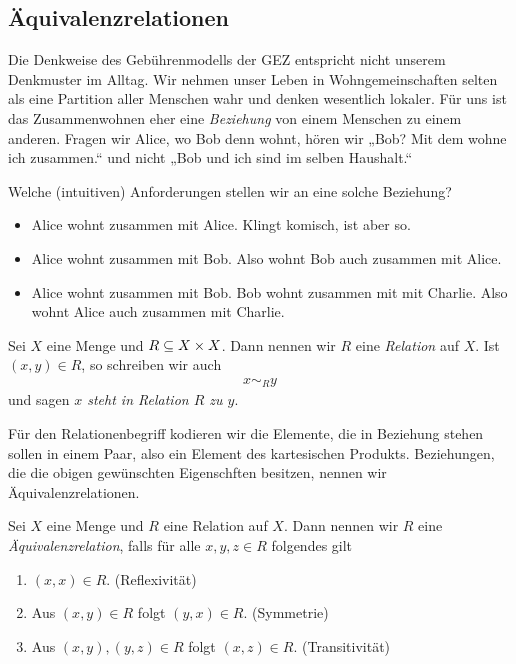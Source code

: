 \subsection{Äquivalenzrelationen}

Die Denkweise des Gebührenmodells der GEZ entspricht nicht unserem
Denkmuster im Alltag. Wir nehmen unser Leben in Wohngemeinschaften selten
als eine Partition aller Menschen wahr und denken wesentlich lokaler. Für
uns ist das Zusammenwohnen eher eine \emph{Beziehung} von einem Menschen zu
einem anderen. Fragen wir Alice, wo Bob denn wohnt, hören wir „Bob? Mit dem
wohne ich zusammen.“ und nicht „Bob und ich sind im selben Haushalt.“

Welche (intuitiven) Anforderungen stellen wir an eine solche Beziehung?

\begin{itemize}
  \item Alice wohnt zusammen mit Alice. Klingt komisch, ist aber so.
  \item Alice wohnt zusammen mit Bob. Also wohnt Bob auch zusammen mit
    Alice.
  \item Alice wohnt zusammen mit Bob. Bob wohnt zusammen mit mit
    Charlie. Also wohnt Alice auch zusammen mit Charlie.
\end{itemize}


\begin{defin}

  Sei $X$ eine Menge und $R \subseteq X\times X$. Dann nennen wir $R$ eine
  \emph{Relation} auf $X$. Ist $(x,y)\in R$, so schreiben wir auch
  \begin{align*}
    x \sim_{R} y
  \end{align*}
  und sagen \emph{$x$ steht in Relation $R$ zu $y$}.

\end{defin}


Für den Relationenbegriff kodieren wir die Elemente, die in Beziehung
stehen sollen in einem Paar, also ein Element des kartesischen
Produkts. Beziehungen, die die obigen gewünschten Eigenschften besitzen,
nennen wir Äquivalenzrelationen.


\begin{defin}

  Sei $X$ eine Menge und $R$ eine Relation auf $X$. Dann nennen wir $R$
  eine \emph{Äquivalenzrelation}, falls für alle $x,y,z\in R$ folgendes
  gilt
  \begin{enumerate}
    \item $(x,x)\in R$. \hfill (Reflexivität)
    \item Aus $(x,y)\in R$ folgt $(y,x)\in R$. \hfill (Symmetrie)
    \item Aus $(x,y),(y,z)\in R$ folgt $(x,z)\in R$. \hfill (Transitivität)
  \end{enumerate}
    
\end{defin}

